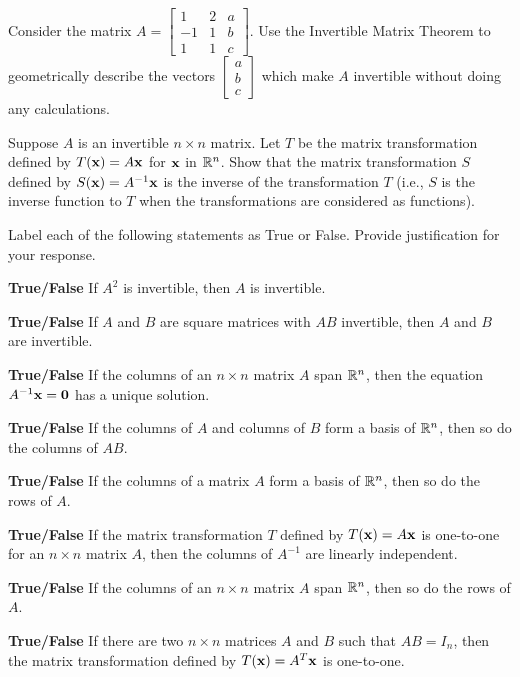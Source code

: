 \label{sec:imt_exer}

\be
\item Consider the matrix $A=\left[ \begin{array}{rcc} 1&2&a \\ -1&1&b \\ 1&1&c \end{array} \right]$. Use the Invertible Matrix Theorem to geometrically describe the vectors $\left[ \begin{array}{c} a \\ b\\ c\end{array} \right]$ which make $A$ invertible without doing any calculations.

\item Suppose $A$ is an invertible $n\times n$ matrix. Let $T$ be the matrix transformation defined by $T(\mathbf{x})=A\mathbf{x}$ for $\mathbf{x}$ in $\mathbb{R}^n$. Show that the matrix transformation $S$ defined by $S(\mathbf{x})=A^{-1}\mathbf{x}$ is the inverse of the transformation $T$ (i.e., $S$ is the inverse function to $T$ when the transformations are considered as functions).

\item Label each of the following statements as True or False. Provide justification for your response.
\ba
\item \textbf{True/False} If $A^2$ is invertible, then $A$ is invertible.

\item \textbf{True/False} If $A$ and $B$ are square matrices with $AB$ invertible, then $A$ and $B$ are invertible.

\item \textbf{True/False} If the columns of an $n \times n$ matrix $A$ span $\mathbb{R}^n$, then the equation $A^{-1}\mathbf{x} =\mathbf{0}$ has a unique solution.

\item \textbf{True/False} If the columns of $A$ and columns of $B$ form a basis of $\mathbb{R}^n$, then so do the columns of $AB$.

\item \textbf{True/False} If the columns of a matrix $A$ form a basis of $\mathbb{R}^n$, then so do the rows of $A$.

\item \textbf{True/False} If the matrix transformation $T$ defined by $T(\mathbf{x})=A\mathbf{x}$ is one-to-one for an $n\times n$ matrix $A$, then the columns of $A^{-1}$ are linearly independent.

\item \textbf{True/False} If the columns of an $n\times n$ matrix $A$ span $\mathbb{R}^n$, then so do the rows of $A$.

\item \textbf{True/False} If there are two $n\times n$ matrices $A$ and $B$ such that $AB=I_n$, then the matrix transformation defined by $T(\mathbf{x})=A^T\mathbf{x}$ is one-to-one.

\ea
\ee

